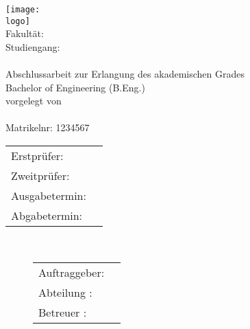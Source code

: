 

\thispagestyle{plain}

\begin{titlepage}
\singlespacing

\begin{center}


\texttt{[image: \\logo]}\\[5ex]

\large{Fakultät: \fakultaet}\\
\large{Studiengang: \studiengang}
\\[9ex]

\LARGE{\textbf{\titelum}}\\[7ex]

\Large{Abschlussarbeit zur Erlangung des akademischen Grades}\\
\Large{Bachelor of Engineering (B.Eng.)}\\[3ex]

\large{vorgelegt von}\\[1ex]

\Large{\textbf{\autor}}\\
\large{Matrikelnr: 1234567}\\[5ex]


\large{
\begin{tabular}{ll}
Erstprüfer:		& \erstpruefer		\\[1.1ex]
Zweitprüfer:	& \zweitpruefer		\\[1.1ex]
Ausgabetermin: 	& \ausgabetermin	\\[1.1ex]
Abgabetermin: 	&\abgabetermin		\\
\end{tabular}
}\\[7ex]

\end{center}

\begin{figure}[htbp]
	\begin{minipage}[b]{5cm}
	\large{
	\begin{tabular}{ll}
	Auftraggeber: \\[1ex]
	Abteilung 	: \\[1ex]
	Betreuer	: 
	
	\end{tabular}}
		 
	\end{minipage}
	\hfill
	\hfill
	\hfill
	\hfill
	\hfill
	\hfill
	\hfill
	\hfill
	\hfill
	\hfill
	\hfill
	\begin{minipage}[b]{3.6cm}
	
	\end{minipage}
\end{figure}


\end{titlepage}